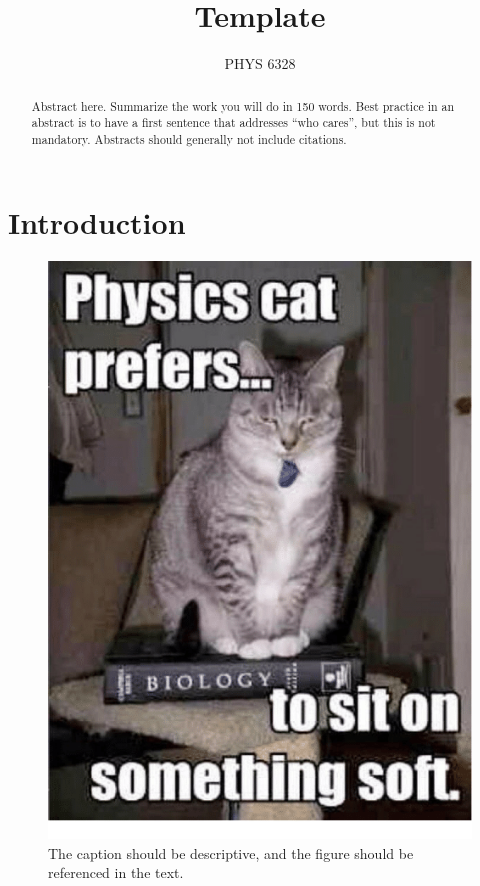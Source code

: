 \documentclass[12pt, oneside]{article}
\title{Template}
\author{PHYS 6328}
\newcommand{\mycaption}[1]{\caption{\footnotesize{#1}}}
\begin{document}
\maketitle
\begin{abstract}
Abstract here.  Summarize the work you will do in 150 words.  Best practice in an abstract is to have a first sentence that addresses ``who cares'', but this is not mandatory.  Abstracts should generally not include citations.  
\end{abstract}

\eject

\section{Introduction}


\begin{figure}
\vspace{-.4in}
\centering
\includegraphics[width=.3\textwidth]{image.png}
\mycaption{\label{figure.fig}  The caption should be descriptive, and the figure should be referenced in the text.  }
\vspace{-.1in}
\noindent \hrulefill
\end{figure}
\end{document}
